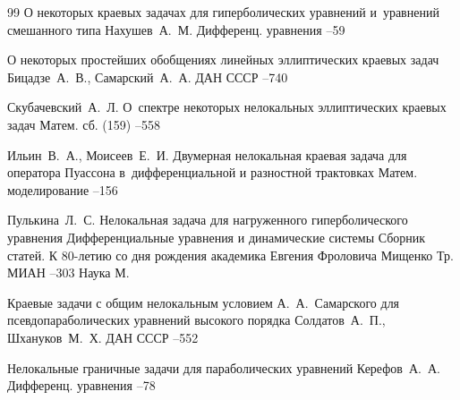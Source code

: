 {\begin{thebibliography}{99}
\paper О некоторых краевых задачах для гиперболических уравнений и~уравнений смешанного типа
\by Нахушев~А.~М.
\jour Дифференц. уравнения
--59

\paper О некоторых простейших обобщениях линейных эллиптических краевых задач
\by Бицадзе~А.~В., Самарский~А.~А.
\jour ДАН СССР
--740

\by Скубачевский~А.~Л.
\paper О~спектре некоторых нелокальных эллиптических
краевых задач
\jour Матем. сб.
(159)
--558

\by Ильин~В.~А., Моисеев~Е.~И.
\paper Двумерная нелокальная краевая задача для оператора Пуассона в~дифференциальной и разностной трактовках
\jour Матем. моделирование
--156

\by Пулькина~Л.~С.
\paper Нелокальная задача для нагруженного гиперболического уравнения
\inbook Дифференциальные уравнения и динамические системы
\bookinfo Сборник статей. К 80-летию со дня рождения академика Евгения Фроловича Мищенко
\serial Тр. МИАН
--303
\publ Наука
\publaddr М.


\paper Краевые задачи с общим нелокальным условием А.~А.~Самарского для псевдопараболических уравнений высокого порядка
\by Солдатов~А.~П., Шхануков~М.~Х.
\jour ДАН СССР
--552

\paper Нелокальные граничные задачи для параболических уравнений
\by Керефов~А.~А.
\jour Дифференц. уравнения
--78


\end{thebibliography}}
